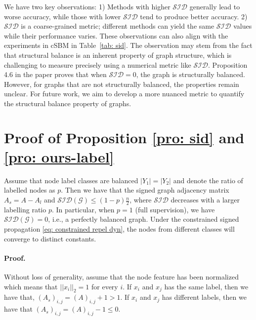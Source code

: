 We have two key observations: 1) Methods with higher $\mathcal{SID}$ generally lead to worse accuracy, while those with lower $\mathcal{SID}$ tend to produce better accuracy. 2) $\mathcal{SID}$ is a coarse-grained metric; different methods can yield the same $\mathcal{SID}$ values while their performance varies. These observations can also align with the experiments in cSBM in Table~\ref{tab: sid}.
The observation may stem from the fact that structural balance is an inherent property of graph structure, which is challenging to measure precisely using a numerical metric like $\mathcal{SID}$. Proposition 4.6 in the paper proves that when $\mathcal{SID}=0$, the graph is structurally balanced. 
However, for graphs that are not structurally balanced, the properties remain unclear. 
For future work, we aim to develop a more nuanced metric to quantify the structural balance property of graphs.





\section{Proof of Proposition \ref{pro: sid} and \ref{pro: ours-label}}
\label{app: proof of label-sbp}

\begin{proposition}
Assume that node label classes are balanced $|Y_1| = |Y_2|$
and denote the ratio of labelled nodes as $p$.
Then we have that the signed graph adjacency matrix $A_s= A-A_l$ and $\mathcal{SID}(\mathcal{G})\leq (1-p)\frac{n}{2}$, where $\mathcal{SID}$ decreases with a larger labelling ratio $p$. In particular, when $p=1$ (full supervision), we have $\mathcal{SID}(\mathcal{G})=0$, i.e., a perfectly balanced graph.
Under the constrained signed propagation \eqref{eq: constrained repel dyn}, the nodes from different classes will converge to distinct constants.
\end{proposition}

\paragraph{Proof.}
Without loss of generality, assume that the node feature has been normalized which means that $||x_i||_2=1$ for every $i$.
If $x_i$ and $x_j$ has the same label, then we have that, $(A_s)_{i,j}=(A)_{i,j}+1>1$.
If $x_i$ and $x_j$ has different labels, then we have that $(A_s)_{i,j}=(A)_{i,j}-1\leq0$.

